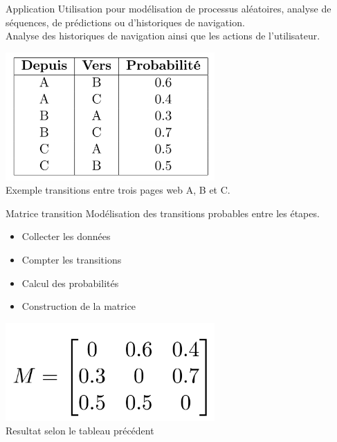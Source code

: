 \begin{frame}{Application}
	\vspace*{-0.3cm}
	Utilisation pour modélisation de processus aléatoires, analyse de séquences, de prédictions ou d'historiques de navigation.  \\
    Analyse des historiques de navigation ainsi que les actions de l'utilisateur. \\

	\begin{center}
		\includegraphics[width=0.6\textwidth]{images/tableau_proba_markov.png}\\
     Exemple transitions entre trois pages web A, B et C. 
	\end{center}
\end{frame}

\begin{frame}{Matrice transition}
		Modélisation des transitions probables entre les étapes.
        \begin{itemize}
            \item Collecter les données
            \item Compter les transitions
            \item Calcul des probabilités 
            \item Construction de la matrice
        \end{itemize}
	\begin{center}
		\includegraphics[width=0.6\textwidth]{images/matrice_transition.png} \\
        Resultat selon le tableau précédent
	\end{center}
\end{frame}

